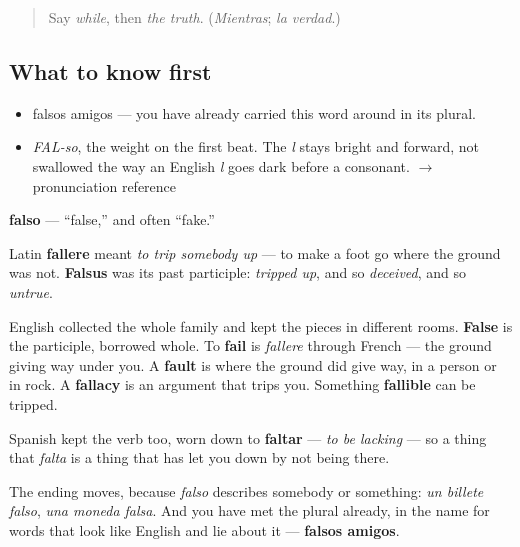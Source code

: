 \label{lesson:ES-C324-falso}



\begin{quote}
Say \emph{while}, then \emph{the truth}. (\emph{Mientras}; \emph{la verdad}.)
\end{quote}

\subsection*{What to know first}
\begin{itemize}
\raggedright
  \item falsos amigos — you have already carried this word around in its plural.
\end{itemize}

\begin{sounds}
\begin{itemize}
\raggedright
  \item \emph{FAL-so}, the weight on the first beat. The \emph{l} stays bright and forward, not swallowed the way an English \emph{l} goes dark before a consonant. $\to$ pronunciation reference
\end{itemize}
\end{sounds}

\begin{cousinweb}
\textbf{falso} — \textquotedblleft{}false,\textquotedblright{} and often \textquotedblleft{}fake.\textquotedblright{}

Latin \textbf{fallere} meant \emph{to trip somebody up} — to make a foot go where the ground was not. \textbf{Falsus} was its past participle: \emph{tripped up}, and so \emph{deceived}, and so \emph{untrue}.

English collected the whole family and kept the pieces in different rooms. \textbf{False} is the participle, borrowed whole. To \textbf{fail} is \emph{fallere} through French — the ground giving way under you. A \textbf{fault} is where the ground did give way, in a person or in rock. A \textbf{fallacy} is an argument that trips you. Something \textbf{fallible} can be tripped.

Spanish kept the verb too, worn down to \textbf{faltar} — \emph{to be lacking} — so a thing that \emph{falta} is a thing that has let you down by not being there.

The ending moves, because \emph{falso} describes somebody or something: \emph{un billete falso}, \emph{una moneda falsa}. And you have met the plural already, in the name for words that look like English and lie about it — \textbf{falsos amigos}.
\end{cousinweb}

